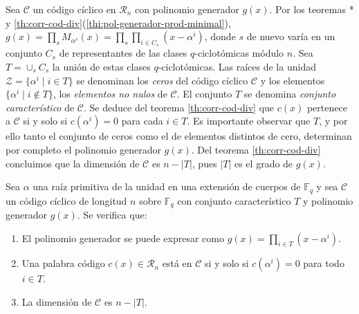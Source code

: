 Sea \(\mathcal C\) un código cíclico en \(\mathcal R_n\) con polinomio generador \(g(x)\).
Por los teoremas * y \ref{th:corr-cod-div}(\ref{thi:pol-generador-prod-minimal}), \(g(x) = \prod_{s}M_{\alpha^s}(x) = \prod_s\prod_{i \in C_s}(x - \alpha^{i})\), donde \(s\) de nuevo varía en un conjunto \(C_s\) de representantes de las clases \(q\)-ciclotómicas módulo \(n\).
Sea \(T = \cup_s C_s\) la unión de estas clases \(q\)-ciclotómicas.
Las raíces de la unidad \(\mathcal Z = \{\alpha^{i} \mid i \in T\}\) se denominan los \textit{ceros} del código cíclico \(\mathcal C\) y los elementos \(\{\alpha^{i} \mid i \notin T\}\), los \textit{elementos no nulos} de \(\mathcal C\).
El conjunto \(T\) se denomina \textit{conjunto característico} de \(\mathcal C\).
Se deduce del teorema \ref{th:corr-cod-div} que \(c(x)\) pertenece a \(\mathcal C\) si y solo si \(c(\alpha^{i}) = 0\) para cada \(i \in T\).
Es importante observar que \(T\), y por ello tanto el conjunto de ceros como el de elementos distintos de cero, determinan por completo el polinomio generador \(g(x)\).
Del teorema \ref{th:corr-cod-div} concluimos que la dimensión de \(\mathcal C\) es \(n - |T|\), pues \(|T|\) es el grado de \(g(x)\).


\begin{theorem}
  \label{th:cicl-cto-caracteristico}
  Sea \(\alpha\) una raíz primitiva de la unidad en una extensión de cuerpos de \(\mathbb F_q\) y sea \(\mathcal C\) un código cíclico de longitud \(n\) sobre \(\mathbb F_q\) con conjunto característico \(T\) y polinomio generador \(g(x)\).
  Se verifica que: \begin{enumerate}
    \item El polinomio generador se puede expresar como \(g(x) = \prod_{i \in T}(x - \alpha^i)\).
    \item Una palabra código \(c(x) \in \mathcal R_n\) está en \(\mathcal C\) si y solo si \(c(\alpha^i) = 0\) para todo \(i \in T\).
    \item La dimensión de \(\mathcal C\) es \(n - |T|\).
  \end{enumerate}
\end{theorem}

